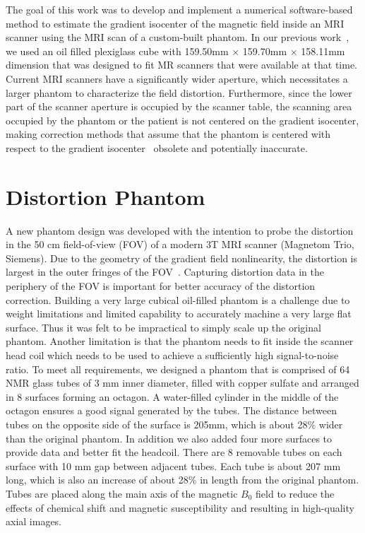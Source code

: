 The goal of this work was to develop and implement a numerical software-based method to estimate the gradient isocenter of the magnetic field inside an MRI scanner using the MRI scan of a custom-built phantom.  In our previous work~\cite{LSS06a,LSS06b,LSS08a,tlee_iaeng}, we used an oil filled plexiglass cube with
159.50mm $\times$ 159.70mm $\times$ 158.11mm dimension that was designed to fit MR scanners that were available at that time.  Current MRI scanners have a significantly wider aperture, which necessitates a larger phantom to characterize the field distortion.  Furthermore, since the lower part of the scanner aperture is occupied by the scanner table, the scanning area occupied by the phantom or the patient is not centered on the gradient isocenter, making correction methods that assume that the phantom is centered with respect to the gradient isocenter~\cite{LSS06a,LSS06b,LSS08a,tlee_iaeng,simple_approach} obsolete and potentially inaccurate.

\section{Distortion Phantom}
A new phantom design was developed with the intention to probe the distortion in the 50 cm field-of-view (FOV) of a modern 3T MRI scanner (Magnetom Trio, Siemens).  Due to the geometry of the gradient field nonlinearity, the distortion is largest in the outer fringes of the FOV~\cite{LSS06a,LSS06b,LSS08a,tlee_iaeng}. Capturing distortion data in the periphery of the FOV is important for better accuracy of the distortion correction. Building a very large cubical oil-filled phantom is a challenge due to weight limitations and limited capability to accurately machine a very large flat surface. Thus it was felt to be impractical to simply scale up the original phantom.  Another limitation is that the phantom needs to fit inside the scanner head coil which needs to be used to achieve a sufficiently high signal-to-noise ratio.  To meet all requirements, we designed a phantom that is comprised of 64 NMR glass tubes of 3 mm inner diameter, filled with copper sulfate and arranged in 8 surfaces forming an octagon.  A water-filled cylinder in the middle of the octagon ensures a good signal generated by the tubes.  The distance between tubes on the opposite side of the surface is 205mm, which is about 28\% wider than the original phantom. In addition we also added four more surfaces to provide data and better fit the headcoil.  There are 8 removable tubes on each surface with 10 mm gap between adjacent tubes.  Each tube is about 207 mm long, which is also an increase of about 28\% in length from the original phantom.  Tubes are placed along the main axis of the magnetic $B_0$  field to reduce the effects of chemical shift and magnetic susceptibility and
resulting in high-quality axial images.

